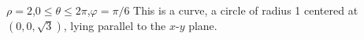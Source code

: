 {$\rho=2$,\quad $0\leq \theta\leq2\pi$,\quad $\varphi = \pi/6$
}
{This is a curve, a circle of radius 1 centered at $(0,0,\sqrt 3)$, lying parallel to the $x$-$y$ plane.
}
